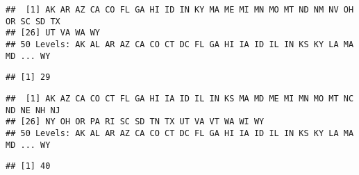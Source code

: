 \documentclass[
]{article}
\newenvironment{Shaded}{\begin{snugshade}}{\end{snugshade}}
\newcommand{\KeywordTok}[1]{\textcolor[rgb]{0.13,0.29,0.53}{\textbf{#1}}}
\newcommand{\NormalTok}[1]{#1}
\newcommand{\OperatorTok}[1]{\textcolor[rgb]{0.81,0.36,0.00}{\textbf{#1}}}
\begin{document}
\begin{Shaded}
\end{Shaded}

\begin{verbatim}
##  [1] AK AR AZ CA CO FL GA HI ID IN KY MA ME MI MN MO MT ND NM NV OH OR SC SD TX
## [26] UT VA WA WY
## 50 Levels: AK AL AR AZ CA CO CT DC FL GA HI IA ID IL IN KS KY LA MA MD ... WY
\end{verbatim}

\begin{Shaded}
\end{Shaded}

\begin{verbatim}
## [1] 29
\end{verbatim}

\begin{Shaded}
\end{Shaded}

\begin{verbatim}
##  [1] AK AZ CA CO CT FL GA HI IA ID IL IN KS MA MD ME MI MN MO MT NC ND NE NH NJ
## [26] NY OH OR PA RI SC SD TN TX UT VA VT WA WI WY
## 50 Levels: AK AL AR AZ CA CO CT DC FL GA HI IA ID IL IN KS KY LA MA MD ... WY
\end{verbatim}

\begin{Shaded}
\end{Shaded}

\begin{verbatim}
## [1] 40
\end{verbatim}

\begin{Shaded}
\end{Shaded}
\end{document}
